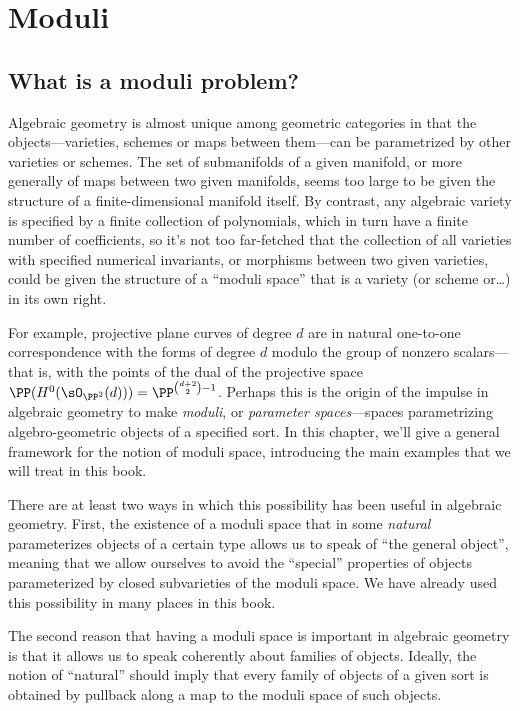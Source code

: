 

\chapter{Moduli} 
\label{Moduli chapter}\label{ModuliChapter}

\section{What is a moduli problem?}

Algebraic geometry is almost unique among geometric categories in that the objects---varieties,  schemes or maps between them---can be parametrized by other varieties or schemes. The set of submanifolds of a given manifold, or more generally of maps between two given manifolds, seems too large to be given the structure of a finite-dimensional manifold itself. By contrast, any algebraic variety is specified by a finite collection of polynomials, which in turn have a finite number of coefficients, so it's not too far-fetched that the collection of all varieties with specified numerical invariants, or morphisms between two given varieties, could be given the structure of a ``moduli space'' that is a variety (or scheme or\dots) in its own right.

For example, projective plane curves of degree $d$
are in natural one-to-one correspondence with the forms of degree $d$ modulo the group of nonzero scalars---that is, with the points of the dual of the projective space
$ \PP(H^0(\sO_{\PP^2}(d)))=\PP^{\binom{d+2}{2}-1} $.
Perhaps this is the origin of the impulse in algebraic geometry to make 
 \emph{moduli}, or \emph{parameter spaces}---spaces parametrizing algebro-geometric objects of a specified sort. In this chapter, we'll give a general framework for the notion of moduli space, introducing the main examples that we will treat in this book.

There are at least two ways in which this possibility has been useful in algebraic geometry. First, the existence of a moduli space that in some \emph{natural} parameterizes objects of a certain type allows us to speak of ``the general object'', meaning that we allow ourselves to avoid the ``special'' properties of objects parameterized by closed subvarieties of the moduli space. We have already used this
possibility in many places in this book. 

The second reason that having a moduli space is important in algebraic geometry is that it allows us to speak coherently about
families of objects. Ideally, the notion of ``natural'' should imply that every family of objects of a given sort
is obtained by pullback along a map to the moduli space of such objects. 

